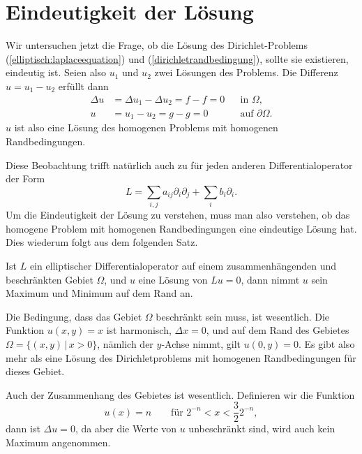%
%
%
\section{Eindeutigkeit der Lösung}
Wir untersuchen jetzt die Frage, ob die Lösung des 
Dirichlet-Problems (\ref{elliptisch:laplaceequation}) und
(\ref{dirichletrandbedingung}), sollte sie existieren, eindeutig ist.
Seien also $u_1$ und $u_2$ zwei Lösungen des Problems. Die Differenz
$u=u_1-u_2$ erfüllt dann
\[
\begin{aligned}
\Delta u&=\Delta u_1-\Delta u_2=f-f=0&&\text{in $\Omega$,}\\
u&=u_1-u_2=g-g=0&&\text{auf $\partial\Omega$.}
\end{aligned}
\]
$u$ ist also eine Lösung des homogenen Problems mit homogenen
Randbedingungen.

Diese Beobachtung trifft natürlich auch zu für jeden anderen
Differentialoperator der Form
\[
L=\sum_{i,j}a_{ij}\partial_i\partial_j+\sum_i b_i\partial_i.
\]
Um die Eindeutigkeit der Lösung zu verstehen, muss man also verstehen,
ob das homogene Problem mit homogenen Randbedingungen eine
eindeutige Lösung hat. Dies wiederum folgt aus dem folgenden Satz.

\begin{satz}
\label{maximumprinzip}
Ist $L$ ein elliptischer Differentialoperator auf einem zusammenhängenden
und beschränkten Gebiet $\Omega$,
und $u$ eine Lösung von $Lu=0$,
dann nimmt $u$ sein Maximum und Minimum auf dem Rand an.
\end{satz}

Die Bedingung, dass das Gebiet $\Omega$ beschränkt sein muss, ist
wesentlich.
Die Funktion $u(x,y)=x$ ist harmonisch, $\Delta x=0$, und auf
dem Rand des Gebietes $\Omega=\{(x,y)\,|\,x>0\}$, nämlich
der $y$-Achse nimmt, gilt $u(0,y)=0$.
Es gibt also mehr als eine Lösung des Dirichletproblems mit
homogenen Randbedingungen für dieses Gebiet.

Auch der Zusammenhang des Gebietes ist wesentlich.  Definieren wir
die Funktion 
\[
u(x)=n\qquad\text{für $2^{-n} < x < \frac{3}{2}2^{-n}$},
\]
dann ist $\Delta u=0$, da aber die Werte von $u$ unbeschränkt sind,
wird auch kein Maximum angenommen.

